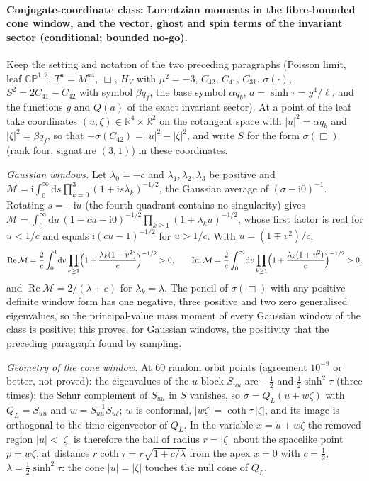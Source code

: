 \paragraph{Conjugate-coordinate class: Lorentzian moments in the fibre-bounded cone window, and the vector, ghost and spin terms of the invariant sector (conditional; bounded no-go).}
Keep the setting and notation of the two preceding paragraphs (Poisson limit, leaf \(\mathbb{CP}^{1,2}\), \(T^a=M^{a4}\), \(\Box\), \(H_V\) with \(\mu^2=-3\), \(C_{42}\), \(C_{41}\), \(C_{31}\), \(\sigma(\cdot)\), \(S^2=2C_{41}-C_{42}\) with symbol \(\beta q_f\), the base symbol \(\alpha q_b\), \(a=\sinh\tau=y^4/\ell\), and the functions \(g\) and \(Q(a)\) of the exact invariant sector). At a point of the leaf take coordinates \((u,\zeta)\in\mathbb R^4\times\mathbb R^2\) on the cotangent space with \(|u|^2=\alpha q_b\) and \(|\zeta|^2=\beta q_f\), so that \(-\sigma(C_{42})=|u|^2-|\zeta|^2\), and write \(S\) for the form \(\sigma(\Box)\) (rank four, signature \((3,1)\)) in these coordinates.

\emph{Gaussian windows.} Let \(\lambda_0=-c\) and \(\lambda_1,\lambda_2,\lambda_3\) be positive and \(\mathcal M=\mathrm i\int_0^\infty\mathrm ds\prod_{k=0}^3(1+\mathrm is\lambda_k)^{-1/2}\), the Gaussian average of \((\sigma-\mathrm i0)^{-1}\). Rotating \(s=-\mathrm iu\) (the fourth quadrant contains no singularity) gives \(\mathcal M=\int_0^\infty\mathrm du\,(1-cu-\mathrm i0)^{-1/2}\prod_{k\ge1}(1+\lambda_ku)^{-1/2}\), whose first factor is real for \(u<1/c\) and equals \(\mathrm i(cu-1)^{-1/2}\) for \(u>1/c\). With \(u=(1\mp v^2)/c\),
\[
  \operatorname{Re}\mathcal M=\frac2c\int_0^1\!\mathrm dv\prod_{k\ge1}\Bigl(1+\frac{\lambda_k(1-v^2)}c\Bigr)^{-1/2}>0,\qquad
  \operatorname{Im}\mathcal M=\frac2c\int_0^\infty\!\mathrm dv\prod_{k\ge1}\Bigl(1+\frac{\lambda_k(1+v^2)}c\Bigr)^{-1/2}>0 ,
\]
and \(\operatorname{Re}\mathcal M=2/(\lambda+c)\) for \(\lambda_k=\lambda\). The pencil of \(\sigma(\Box)\) with any positive definite window form has one negative, three positive and two zero generalised eigenvalues, so the principal-value mass moment of every Gaussian window of the class is positive; this proves, for Gaussian windows, the positivity that the preceding paragraph found by sampling.

\emph{Geometry of the cone window.} At \(60\) random orbit points (agreement \(10^{-9}\) or better, not proved): the eigenvalues of the \(u\)-block \(S_{uu}\) are \(-\tfrac12\) and \(\tfrac12\sinh^2\tau\) (three times); the Schur complement of \(S_{uu}\) in \(S\) vanishes, so \(\sigma=Q_L(u+w\zeta)\) with \(Q_L=S_{uu}\) and \(w=S_{uu}^{-1}S_{u\zeta}\); \(w\) is conformal, \(|w\zeta|=\coth\tau\,|\zeta|\), and its image is orthogonal to the time eigenvector of \(Q_L\). In the variable \(x=u+w\zeta\) the removed region \(|u|<|\zeta|\) is therefore the ball of radius \(r=|\zeta|\) about the spacelike point \(p=w\zeta\), at distance \(r\coth\tau=r\sqrt{1+c/\lambda}\) from the apex \(x=0\) with \(c=\tfrac12\), \(\lambda=\tfrac12\sinh^2\tau\): the cone \(|u|=|\zeta|\) touches the null cone of \(Q_L\).

